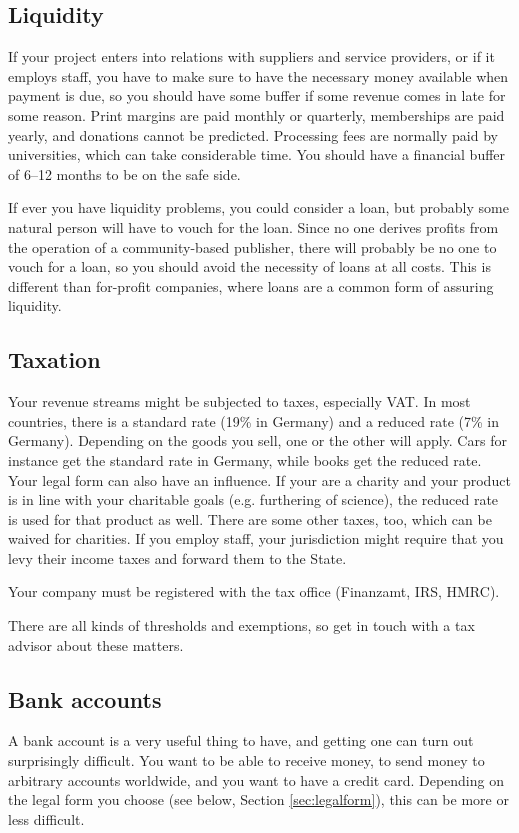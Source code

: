 \documentclass[nonflat,smallfont
]{langsci/langscibook}
\begin{document}
\subsection{Liquidity}
If your project enters into relations with suppliers and service providers, or if it employs staff, you have to make sure to have the necessary money available when payment is due, so you should have some buffer if some revenue comes in late for some reason. Print margins are paid monthly or quarterly, memberships are paid yearly, and donations cannot be predicted. Processing fees are normally paid by universities, which can take considerable time. You should have a financial buffer of 6--12 months to be on the safe side. 

If ever you have liquidity problems, you could consider a loan, but probably some natural person will have to vouch for the loan. Since no one derives profits from the operation of a community-based publisher, there will probably be no one to vouch for a loan, so you should avoid the necessity of loans at all costs. This is different than for-profit companies, where loans are a common form of assuring liquidity. 
   
\subsection{Taxation}
Your revenue streams might be subjected to taxes, especially VAT. In most countries, there is a standard rate (19\% in Germany) and a reduced rate (7\% in Germany). Depending on the goods you sell, one or the other will apply. Cars for instance get the standard rate in Germany, while books get the reduced rate. Your legal form can also have an influence. If your are a charity and your product is in line with your charitable goals (e.g. furthering of science), the reduced rate is used for that product as well. There are some other taxes, too, which can be waived for charities. If you employ staff, your jurisdiction might require that you levy their income taxes and forward them to the State.

Your company must be registered with the tax office (Finanzamt, IRS, HMRC).

There are all kinds of thresholds and exemptions, so get in touch with a tax advisor about these matters. 

\subsection{Bank accounts}
A bank account is a very useful thing to have, and getting one can turn out surprisingly difficult. You want to be able to receive money, to send money to arbitrary accounts worldwide, and you want to have a credit card. Depending on the legal form you choose (see below, Section \ref{sec:legalform}), this can be more or less difficult. 
\end{document}
